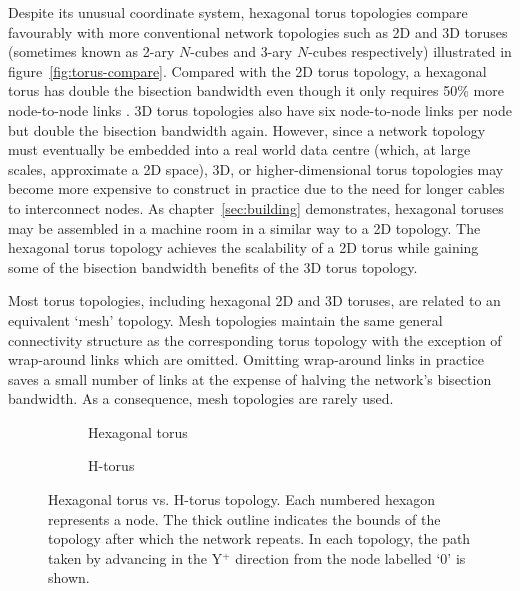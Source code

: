		Despite its unusual coordinate system, hexagonal torus topologies compare
		favourably with more conventional network topologies such as 2D and 3D
		toruses (sometimes known as 2-ary $N$-cubes and 3-ary $N$-cubes
		respectively) \cite{dally04} illustrated in figure~\ref{fig:torus-compare}.
		Compared with the 2D torus topology, a hexagonal torus has double the
		bisection bandwidth even though it only requires 50\% more node-to-node
		links \cite{navaridas09}. 3D torus topologies also have six node-to-node
		links per node but double the bisection bandwidth again. However, since a
		network topology must eventually be embedded into a real world data centre
		(which, at large scales, approximate a 2D space), 3D, or higher-dimensional
		torus topologies may become more expensive to construct in practice due to
		the need for longer cables to interconnect nodes. As
		chapter~\ref{sec:building} demonstrates, hexagonal toruses may be assembled
		in a machine room in a similar way to a 2D topology. The hexagonal torus
		topology achieves the scalability of a 2D torus while gaining some of the
		bisection bandwidth benefits of the 3D torus topology.
		
		Most torus topologies, including hexagonal 2D and 3D toruses, are related
		to an equivalent `mesh' topology. Mesh topologies maintain the same general
		connectivity structure as the corresponding torus topology with the
		exception of wrap-around links which are omitted. Omitting wrap-around
		links in practice saves a small number of links at the expense of halving
		the network's bisection bandwidth. As a consequence, mesh topologies are
		rarely used.
		
		\begin{figure}
			\center
			\begin{subfigure}[b]{0.45\linewidth}
				\center
				\caption{Hexagonal torus}
				\label{fig:topo-compare-hexagonal-torus}
			\end{subfigure}
			\begin{subfigure}[b]{0.45\linewidth}
				\center
				\caption{H-torus}
				\label{fig:topo-compare-h-torus}
			\end{subfigure}
			
			\caption[Hexagonal torus vs. H-torus topology.]%
			{Hexagonal torus vs. H-torus topology. Each numbered hexagon
			represents a node. The thick outline indicates the bounds of the
			topology after which the network repeats. In each topology, the path
			taken by advancing in the Y$^+$ direction from the node labelled `0' is
			shown.}
			\label{fig:topo-compare}
		\end{figure}
		
